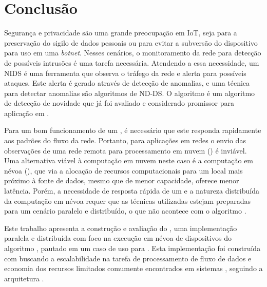 
\chapter{Conclusão}\label{cha:final}


Segurança e privacidade são uma grande preocupação em \acf{IoT}, seja para a
preservação do sigilo de dados pessoais ou para evitar a subversão do
dispositivo para uso em uma \emph{botnet}. Nesses  cenários,
o monitoramento da rede para detecção
de possíveis intrusões é uma tarefa necessária.
Atendendo a essa necessidade, um \acf{NIDS} é uma ferramenta que observa o
tráfego da rede e alerta para possíveis ataques.
Este alerta é gerado através de detecção de anomalias, e uma técnica para
detectar anomalias são algoritmos de \acf{ND-DS}. O algoritmo \minas é um
algoritmo de detecção de novidade que já foi avaliado e considerado promissor para aplicação em \nids.

Para um bom funcionamento de um \nids, é necessário que este responda rapidamente
aos padrões do fluxo da rede. Portanto, para aplicações em redes \iot o envio das
observações de uma rede remota para processamento em nuvem (\cloud) é inviável.
Uma alternativa viável à computação em nuvem neste caso é a computação em névoa
(\fog), que via a alocação de recursos computacionais para um local mais próximo
à fonte de dados, mesmo que de menor capacidade, oferece menor latência.
Porém, a necessidade de resposta rápida de um \nids e a natureza distribuída da
computação em névoa requer que as técnicas utilizadas estejam preparadas para
um cenário paralelo e distribuído, o que não acontece com o algoritmo \minas.

Este trabalho apresenta a construção e avaliação do \mfog, uma implementação
paralela e distribuída com foco na execução em névoa de dispositivos \iot do
algoritmo \minas, pautado em um caso de uso para \nids.
Esta implementação foi construída com \mpi buscando a escalabilidade na tarefa de
processamento de fluxo de dados e economia dos recursos limitados comumente
encontrados em sistemas \iot, seguindo a arquitetura \arch \cite{Cassales2019a}.


